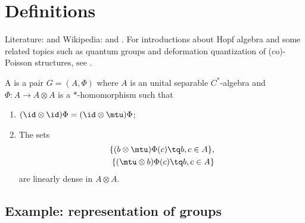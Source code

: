 
\section{Definitions}

Literature: \cite{CompactQuantumGpWoro,Ritter,Koelink,Kustermans} and Wikipedia:  and . For introductions about Hopf algebra and some related topics such as quantum groups and deformation quantization of (co)-Poisson structures, see \cite{Tjin,MaximeRey}.

\begin{definition}
	A  is a pair $G=(A,\Phi)$ where $A$ is an unital separable $C^*$-algebra and $\Phi\colon A\to A\otimes A$ is a $*$-homomorphism such that
	\begin{enumerate}
		\item
		      $(\id\otimes\id)\Phi=(\id\otimes\mtu)\Phi$;
		\item
		      The sets
		      \begin{equation}
			      \begin{aligned}[]
				      \{ (b\otimes\mtu)\Phi(c)\tq b,c\in A \}, \\
				      \{ (\mtu\otimes b)\Phi(c)\tq b,c\in A \}
			      \end{aligned}
		      \end{equation}
		      are linearly dense in $A\otimes A$.
	\end{enumerate}
\end{definition}

\subsection{Example: representation of groups}

